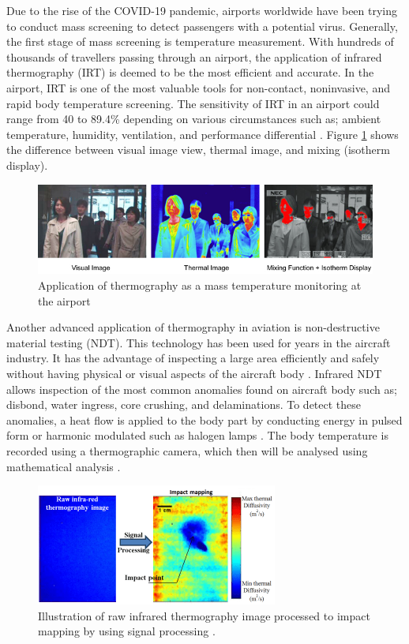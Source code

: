 \noindent Due to the rise of the COVID-19 pandemic, airports worldwide have been trying to conduct mass screening to detect passengers with a potential virus. Generally, the first stage of mass screening is temperature measurement. With hundreds of thousands of travellers passing through an airport, the application of infrared thermography (IRT) is deemed to be the most efficient and accurate. In the airport, IRT is one of the most valuable tools for non-contact, noninvasive, and rapid body temperature screening.  The sensitivity of IRT in an airport could range from 40 to 89.4\% depending on various circumstances such as; ambient temperature, humidity, ventilation, and performance differential \cite{Sun2017ApplicationsStations}. Figure \ref{fig:airport_IR} shows the difference between visual image view, thermal image, and mixing (isotherm display).\\

\begin{figure}[!ht]
    \centering
    \includegraphics[scale=0.65]{Figures/IR_airport.jpg}
    \caption{Application of thermography as a mass temperature monitoring at the airport \cite{AnonymousBodyCO.LTD.}}
    \label{fig:airport_IR}
\end{figure}

\noindent Another advanced application of thermography in aviation is non-destructive material testing (NDT). This technology has been used for years in the aircraft industry. It has the advantage of inspecting a large area efficiently and safely without having physical or visual aspects of the aircraft body \cite{Ibarra-CastanedoInfraredMaterials}. Infrared NDT allows inspection of the most common anomalies found on aircraft body such as; disbond, water ingress, core crushing, and delaminations. To detect these anomalies, a heat flow is applied to the body part by conducting energy in pulsed form or harmonic modulated such as halogen lamps \cite{Stumper2015ThermalAviation}. The body temperature is recorded using a thermographic camera, which then will be analysed using mathematical analysis \cite{Anonymous2013InformationImprovement}.\\

\begin{figure}[!ht]
    \centering
    \includegraphics[scale=1.2]{Figures/IR_NDT.png}
    \caption{Illustration of raw infrared thermography image processed to impact mapping by using signal processing \cite{Non-destructiveLab}.}
    \label{fig:ndt_av}
\end{figure}
 